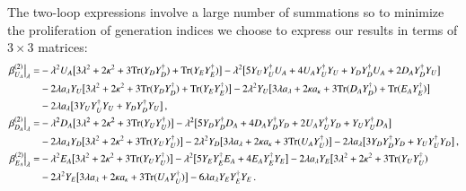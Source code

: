 \documentclass[final,3p,times]{elsarticle}
\newcommand{\lamsq}{\lambda^2}
\newcommand{\kapsq}{\kappa^2}
\newcommand{\tr}{\mathrm{Tr}}
\begin{document}
The two-loop expressions involve a large number of summations so to minimize the proliferation of generation indices we choose to express our results in terms of $3\times 3$ matrices:
%
\begin{align}
\left.\beta_{ U_A}^{(2)}\right|_\lambda =& -\lamsq U_A\big[ 3\lamsq + 2\kapsq 
+ 3\tr( Y_D Y_D^\dagger) + \tr( Y_E Y_E^\dagger) \big] 
-\lamsq\big[ 5 Y_U Y_U^\dagger U_A + 4 U_A Y_U^\dagger Y_U +  Y_D Y_D^\dagger U_A 
+ 2 D_A Y_D^\dagger Y_U \big] \notag \\
%
&-2\lambda  a_\lambda Y_U\big[ 3\lamsq + 2\kapsq + 3\tr( Y_D Y_D^\dagger) 
+ \tr( Y_E Y_E^\dagger) \big] -2\lamsq Y_U\big[ 3\lambda  a_\lambda 
+ 2\kappa a_\kappa + 3\tr( D_A Y_D^\dagger) + \tr( E_A Y_E^\dagger) \big] \notag \\
%
&-2\lambda  a_\lambda\big[ 3 Y_U Y_U^\dagger Y_U +  Y_D Y_D^\dagger Y_U \big]\,, \\
%
%
\left.\beta_{ D_A}^{(2)}\right|_\lambda =& -\lamsq D_A\big[ 3\lamsq + 2\kapsq 
+ 3\tr( Y_U Y_U^\dagger) \big] 
-\lamsq\big[ 5 Y_D Y_D^\dagger D_A + 4 D_A Y_D^\dagger Y_D + 2 U_A Y_U^\dagger Y_D 
+  Y_U Y_U^\dagger D_A \big] \notag \\
%
&-2\lambda  a_\lambda  Y_D\big[ 3\lamsq + 2\kapsq + 3\tr( Y_U Y_U^\dagger) \big]
-2\lamsq Y_D\big[ 3\lambda  a_\lambda + 2\kappa a_\kappa 
+ 3\tr( U_A Y_U^\dagger) \big] -2\lambda  a_\lambda\big[ 3 Y_D Y_D^\dagger Y_D 
+  Y_U Y_U^\dagger Y_D\big]\,,  \\
%
%
\left.\beta_{ E_A}^{(2)}\right|_\lambda =& -\lamsq  E_A\big[ 3\lamsq + 2\kapsq 
+ 3\tr( Y_U Y_U^\dagger) \big] 
-\lamsq\big[ 5 Y_E Y_E^\dagger E_A + 4 E_A Y_E^\dagger Y_E \big] 
-2\lambda  a_\lambda  Y_E\big[ 3\lamsq + 2\kapsq + 3\tr( Y_U Y_U^\dagger) \notag \\
%
&-2\lamsq Y_E\big[ 3\lambda a_\lambda + 2\kappa a_\kappa + 3\tr( U_A Y_U^\dagger) 
\big] -6\lambda a_\lambda  Y_E Y_E^\dagger Y_E\,.
\end{align}
\end{document}
